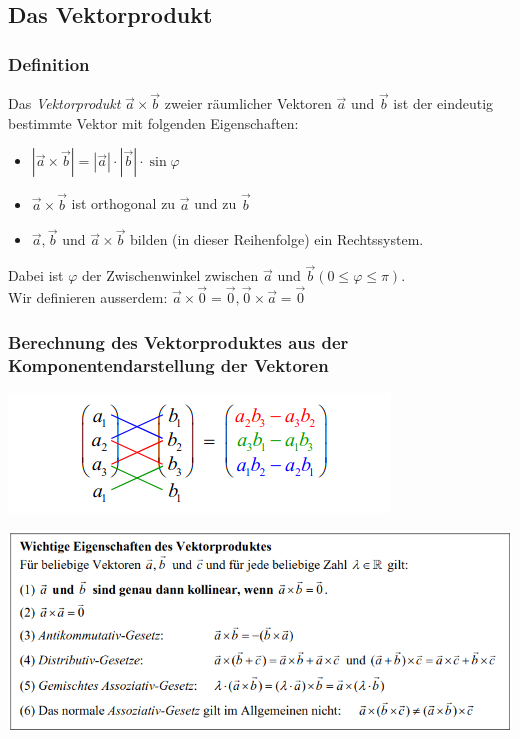 \subsection{Das Vektorprodukt}
\subsubsection{Definition}%
\label{ssub:Definition}
Das \textit{Vektorprodukt} $\vec{a} \times \vec{b}$ zweier räumlicher Vektoren $\vec{a}$ und $\vec{b}$ ist der eindeutig bestimmte Vektor mit folgenden Eigenschaften:
\begin{itemize}
  \item $|\vec{a} \times \vec{b}| = |\vec{a}| \cdot |\vec{b}| \cdot \sin{\varphi}$
  \item $\vec{a} \times \vec{b}$ ist orthogonal zu $\vec{a}$ und zu $\vec{b}$
  \item $\vec{a},\vec{b}$ und $\vec{a} \times \vec{b}$ bilden (in dieser Reihenfolge) ein Rechtssystem.
\end{itemize}
Dabei ist $\varphi$ der Zwischenwinkel zwischen $\vec{a}$ und $\vec{b} (0\leq \varphi \leq \pi)$. \\
Wir definieren ausserdem: $\vec{a} \times \vec{0} = \vec{0}, \vec{0} \times \vec{a} = \vec{0}$

\subsubsection{Berechnung des Vektorproduktes aus der Komponentendarstellung der Vektoren}%
\label{ssub:Berechnung des Vektorproduktes aus der Komponentendarstellung der Vektoren}
\begin{center}
  \includegraphics[width=0.6\linewidth]{images/berechnung_vektorprodukt.png}
\end{center}
\begin{center}
  \includegraphics[width=0.9\linewidth]{images/wichtige_eigenschaften_vektorprodukt.png}
\end{center}

